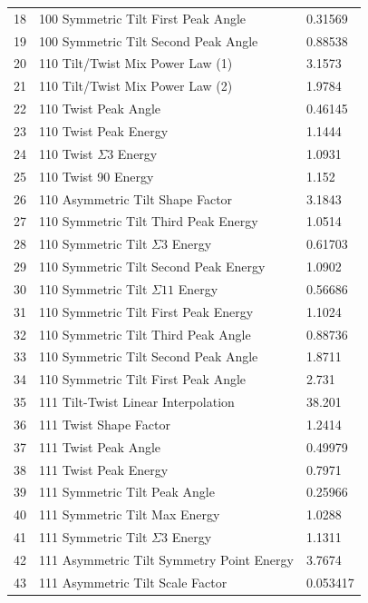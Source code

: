 \documentclass[twoside,senior]{BYUPhys}
\begin{document}
\begin{longtable}{r l l}
18 & \textlangle{}100\textrangle{} Symmetric Tilt First Peak Angle & 0.31569 \\
19 & \textlangle{}100\textrangle{} Symmetric Tilt Second Peak Angle & 0.88538 \\
20 & \textlangle{}110\textrangle{} Tilt/Twist Mix Power Law (1) & 3.1573 \\
21 & \textlangle{}110\textrangle{} Tilt/Twist Mix Power Law (2) & 1.9784 \\
22 & \textlangle{}110\textrangle{} Twist Peak Angle & 0.46145 \\
23 & \textlangle{}110\textrangle{} Twist Peak Energy & 1.1444 \\
24 & \textlangle{}110\textrangle{} Twist $\Sigma3$ Energy & 1.0931 \\
25 & \textlangle{}110\textrangle{} Twist 90\textdegree{} Energy & 1.152 \\
26 & \textlangle{}110\textrangle{} Asymmetric Tilt Shape Factor & 3.1843 \\
27 & \textlangle{}110\textrangle{} Symmetric Tilt Third Peak Energy & 1.0514 \\
28 & \textlangle{}110\textrangle{} Symmetric Tilt $\Sigma3$ Energy & 0.61703 \\
29 & \textlangle{}110\textrangle{} Symmetric Tilt Second Peak Energy & 1.0902 \\
30 & \textlangle{}110\textrangle{} Symmetric Tilt $\Sigma11$ Energy & 0.56686 \\
31 & \textlangle{}110\textrangle{} Symmetric Tilt First Peak Energy & 1.1024 \\
32 & \textlangle{}110\textrangle{} Symmetric Tilt Third Peak Angle & 0.88736 \\
33 & \textlangle{}110\textrangle{} Symmetric Tilt Second Peak Angle & 1.8711 \\
34 & \textlangle{}110\textrangle{} Symmetric Tilt First Peak Angle & 2.731 \\
35 & \textlangle{}111\textrangle{} Tilt-Twist Linear Interpolation & 38.201 \\
36 & \textlangle{}111\textrangle{} Twist Shape Factor & 1.2414 \\
37 & \textlangle{}111\textrangle{} Twist Peak Angle & 0.49979 \\
38 & \textlangle{}111\textrangle{} Twist Peak Energy & 0.7971 \\
39 & \textlangle{}111\textrangle{} Symmetric Tilt Peak Angle & 0.25966 \\
40 & \textlangle{}111\textrangle{} Symmetric Tilt Max Energy & 1.0288 \\
41 & \textlangle{}111\textrangle{} Symmetric Tilt $\Sigma3$ Energy & 1.1311 \\
42 & \textlangle{}111\textrangle{} Asymmetric Tilt Symmetry Point Energy & 3.7674 \\
43 & \textlangle{}111\textrangle{} Asymmetric Tilt Scale Factor & 0.053417 \\
\end{longtable}
\end{document}
